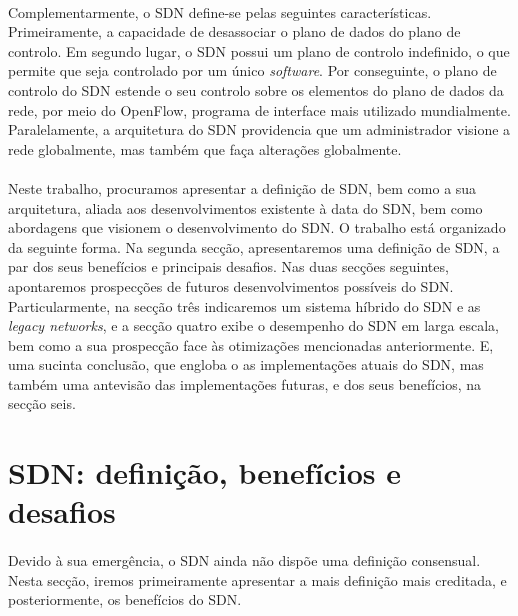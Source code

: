 \documentclass{llncs}
\begin{document}
 \paragraph{}
Complementarmente, o SDN define-se pelas seguintes características. Primeiramente, a capacidade de desassociar o plano de dados do plano de controlo. \cite{paper3}
 Em segundo lugar, o SDN possui um plano de controlo indefinido, o que permite que seja controlado por um único \textit {software}.
 Por conseguinte, o plano de controlo do SDN estende o seu controlo sobre os elementos do plano de dados da rede, por meio do OpenFlow, programa de interface mais utilizado mundialmente.
 Paralelamente, a arquitetura do SDN providencia que um administrador visione a rede globalmente, mas também que faça alterações globalmente.
 \paragraph{}
Neste trabalho, procuramos apresentar a definição de SDN, bem como a sua arquitetura, aliada aos desenvolvimentos existente à data do SDN, bem como abordagens que visionem o desenvolvimento do SDN.
 O trabalho está organizado da seguinte forma. Na segunda secção, apresentaremos uma definição de SDN, a par dos seus benefícios  e principais desafios.
 Nas duas secções seguintes, apontaremos prospecções de futuros desenvolvimentos possíveis do SDN. 
 Particularmente, na secção três indicaremos um sistema híbrido do SDN e as \textit {legacy networks}, e a secção quatro exibe o desempenho do SDN em larga escala, bem como a sua prospecção face às otimizações mencionadas anteriormente. 
 E, uma sucinta conclusão, que engloba o as implementações atuais do SDN, mas também uma antevisão das implementações futuras, e dos seus benefícios, na secção seis.
 \paragraph{}
\section{SDN: definição, benefícios e desafios}
\paragraph{}
Devido à sua emergência, o SDN ainda não dispõe uma definição consensual.
Nesta secção, iremos primeiramente apresentar a mais definição mais creditada, e posteriormente, os benefícios do SDN.
\end{document}
